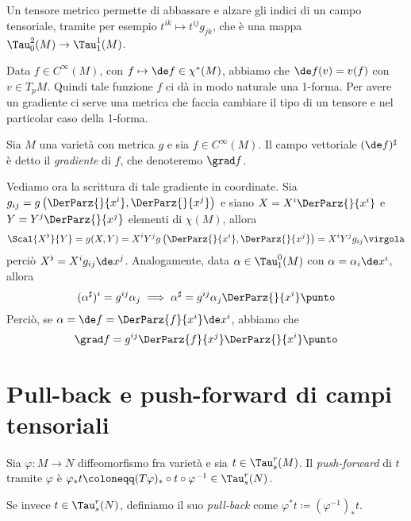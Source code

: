 Un tensore metrico permette di abbassare e alzare gli indici di un campo tensoriale, tramite per esempio $t^{ik} \mapsto t^{ij}g_{jk}$, che è una mappa $\Tau_0^2(M) \to \Tau_1^1(M)$.

Data $f\in C^\infty(M)$, con $f \mapsto \de f \in \chi^*(M)$, abbiamo che $\de f(v) = v(f)$ con $v \in T_pM$. Quindi tale funzione $f$ ci dà in modo naturale una 1-forma.
Per avere un gradiente ci serve una metrica che faccia cambiare il tipo di un tensore e nel particolar caso della 1-forma. %

\begin{definition}
	Sia $M$ una varietà con metrica $g$ e sia $f \in C^\infty(M)$. Il campo vettoriale $(\de f)^\sharp$ è detto il \emph{gradiente} di $f$, che denoteremo $\grad f$. %
\end{definition}

Vediamo ora la scrittura di tale gradiente in coordinate. Sia $g_{ij} = g\left(\DerParz{}{x^i}, \DerParz{}{x^j}\right)$ e siano $X = X^i\DerParz{}{x^i}$ e $Y = Y^j\DerParz{}{x^j}$ elementi di $\chi(M)$, allora
\begin{equation*}
	\Scal{X^\flat}{Y} = g(X,Y) = X^iY^j g\left(\DerParz{}{x^i}, \DerParz{}{x^j}\right) = X^iY^j g_{ij} \virgola
\end{equation*}
perciò $X^\flat = X^i g_{ij} \de x^j$.
Analogamente, data $\alpha \in \Tau_1^0(M)$ con $\alpha = \alpha_i\de x^i$, allora
\begin{equation*}
	(\alpha^\sharp)^i = g^{ij} \alpha_j \implies \alpha^\sharp = g^{ij} \alpha_j\DerParz{}{x^i} \punto
\end{equation*}
Perciò, se $\alpha = \de f = \DerParz{f}{x^i}\de x^i$, abbiamo che
\begin{equation*}
	\grad f = g^{ij} \DerParz{f}{x^j} \DerParz{}{x^i} \punto
\end{equation*}


\section{Pull-back e push-forward di campi tensoriali}

\begin{definition}
	Sia $\varphi : M \to N$ diffeomorfismo fra varietà e sia $t \in \Tau_s^r(M)$. Il \emph{push-forward} di $t$ tramite $\varphi$ è $\varphi_*t \coloneqq (T\varphi)_* \circ t \circ \varphi^{-1} \in \Tau_s^r(N)$.
	
	Se invece $t \in \Tau_s^r(N)$, definiamo il suo \emph{pull-back} come $\varphi^*t \coloneqq (\varphi^{-1})_* t$.
\end{definition}

